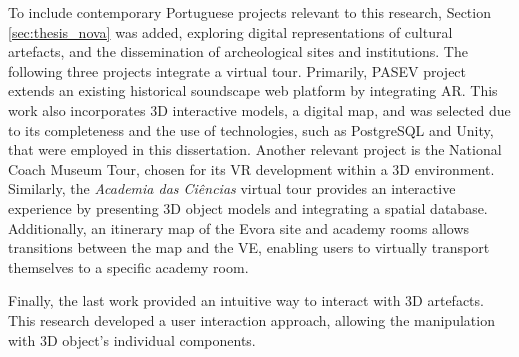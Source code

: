 To include contemporary Portuguese projects relevant to this research, Section \ref{sec:thesis_nova} was added, exploring digital representations of cultural artefacts, and the dissemination of archeological sites and institutions.
The following three projects integrate a virtual tour. Primarily, \gls{PASEV} project extends an existing historical soundscape web platform by integrating \gls{AR}. This work also incorporates 3D interactive models, a digital map, and was selected due to its completeness and the use of technologies, such as PostgreSQL and Unity, that were employed in this dissertation. 
Another relevant project is the National Coach Museum Tour, chosen for its \gls{VR} development within a 3D environment.
Similarly, the \textit{Academia das Ciências} virtual tour provides an interactive experience by presenting \gls{3D} object models and integrating a spatial database. Additionally, an itinerary map of the Evora site and academy rooms allows transitions between the map and the \gls{VE}, enabling users to virtually transport themselves to a specific academy room.

Finally, the last work provided an intuitive way to interact with \gls{3D} artefacts. This research developed a user interaction approach, allowing the manipulation with \gls{3D} object's individual components.


\newcommand{\cmark}{\ding{51}} %
\newcommand{\xmark}{\ding{55}} %

